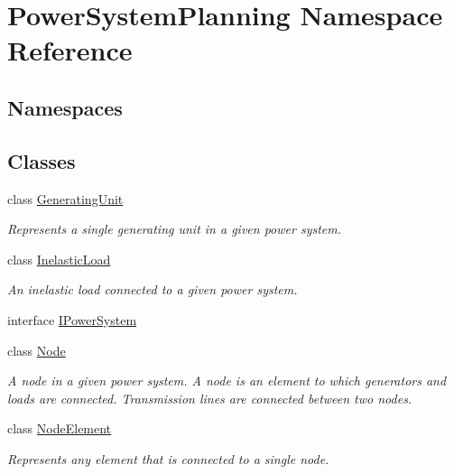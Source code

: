 \hypertarget{namespace_power_system_planning}{}\section{Power\+System\+Planning Namespace Reference}
\label{namespace_power_system_planning}
\subsection*{Namespaces}
\begin{DoxyCompactItemize}
\end{DoxyCompactItemize}
\subsection*{Classes}
\begin{DoxyCompactItemize}
\item 
class \hyperlink{class_power_system_planning_1_1_generating_unit}{Generating\+Unit}
\begin{DoxyCompactList}\small\item\em Represents a single generating unit in a given power system. \end{DoxyCompactList}\item 
class \hyperlink{class_power_system_planning_1_1_inelastic_load}{Inelastic\+Load}
\begin{DoxyCompactList}\small\item\em An inelastic load connected to a given power system. \end{DoxyCompactList}\item 
interface \hyperlink{interface_power_system_planning_1_1_i_power_system}{I\+Power\+System}
\item 
class \hyperlink{class_power_system_planning_1_1_node}{Node}
\begin{DoxyCompactList}\small\item\em A node in a given power system. A node is an element to which generators and loads are connected. Transmission lines are connected between two nodes. \end{DoxyCompactList}\item 
class \hyperlink{class_power_system_planning_1_1_node_element}{Node\+Element}
\begin{DoxyCompactList}\small\item\em Represents any element that is connected to a single node. \end{DoxyCompactList}\item 

\end{DoxyCompactItemize}
